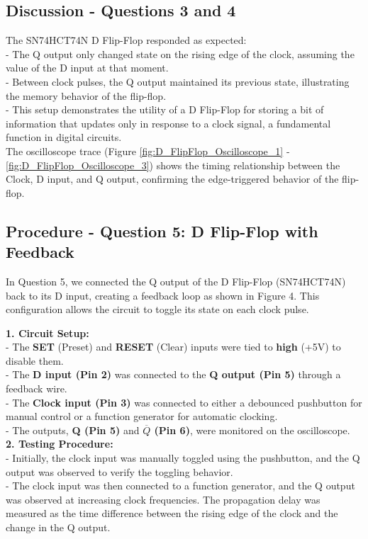 \documentclass{article}
\begin{document}
    \subsection*{\textbf{Discussion - Questions 3 and 4}}
    The SN74HCT74N D Flip-Flop responded as expected: \\ 
    - The Q output only changed state on the rising edge of the clock, assuming the value of the D input at that moment.
    \\
    - Between clock pulses, the Q output maintained its previous state, illustrating the memory behavior of the flip-flop.
    \\
    - This setup demonstrates the utility of a D Flip-Flop for storing a bit of information that updates only in response to a clock signal, a fundamental function in digital circuits.
    \\

    The oscilloscope trace (Figure \ref{fig:D_FlipFlop_Oscilloscope_1} - \ref{fig:D_FlipFlop_Oscilloscope_3}) shows the timing relationship between the Clock, D input, and Q output, confirming the edge-triggered behavior of the flip-flop.

    
    \subsection*{\textbf{Procedure - Question 5: D Flip-Flop with Feedback}}
    In Question 5, we connected the Q output of the D Flip-Flop (SN74HCT74N) back to its D input, creating a feedback loop as shown in Figure 4. This configuration allows the circuit to toggle its state on each clock pulse.
    
    \textbf{1. Circuit Setup:} \\ 
       - The \textbf{SET} (Preset) and \textbf{RESET} (Clear) inputs were tied to \textbf{high} (+5V) to disable them. \\
       - The \textbf{D input (Pin 2)} was connected to the \textbf{Q output (Pin 5)} through a feedback wire. \\
       - The \textbf{Clock input (Pin 3)} was connected to either a debounced pushbutton for manual control or a function generator for automatic clocking. \\
       - The outputs, \textbf{Q (Pin 5)} and \textbf{\(\overline{Q}\) (Pin 6)}, were monitored on the oscilloscope. \\
    
    \textbf{2. Testing Procedure:} \\
       - Initially, the clock input was manually toggled using the pushbutton, and the Q output was observed to verify the toggling behavior. \\ 
       - The clock input was then connected to a function generator, and the Q output was observed at increasing clock frequencies. The propagation delay was measured as the time difference between the rising edge of the clock and the change in the Q output. \\
    
\end{document}

